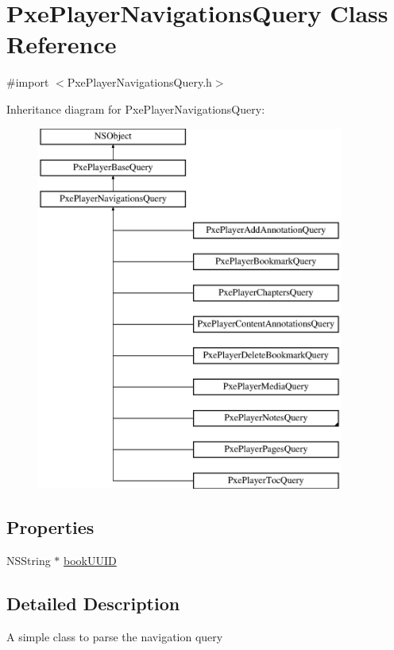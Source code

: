\hypertarget{interface_pxe_player_navigations_query}{\section{Pxe\-Player\-Navigations\-Query Class Reference}
\label{interface_pxe_player_navigations_query}
}


{\ttfamily \#import $<$Pxe\-Player\-Navigations\-Query.\-h$>$}

Inheritance diagram for Pxe\-Player\-Navigations\-Query\-:\begin{figure}[H]
\begin{center}
\leavevmode
\includegraphics[height=12.000000cm]{interface_pxe_player_navigations_query}
\end{center}
\end{figure}
\subsection*{Properties}
\begin{DoxyCompactItemize}
\item 
N\-S\-String $\ast$ \hyperlink{interface_pxe_player_navigations_query_a1266ecf2f78b4331a6f1efa1c7015ea2}{book\-U\-U\-I\-D}
\end{DoxyCompactItemize}


\subsection{Detailed Description}
A simple class to parse the navigation query 

